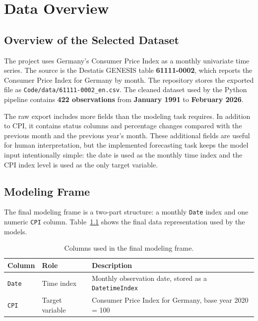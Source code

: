 %
%
%

\chapter{Data Overview}
\label{ch:data-overview}

\section{Overview of the Selected Dataset}

The project uses Germany's Consumer Price Index as a monthly univariate time series. The source is the Destatis GENESIS table \textbf{61111-0002}, which reports the Consumer Price Index for Germany by month. The repository stores the exported file as \texttt{Code/data/61111-0002\_en.csv}. The cleaned dataset used by the Python pipeline contains \textbf{422 observations} from \textbf{January 1991} to \textbf{February 2026}.

The raw export includes more fields than the modeling task requires. In addition to CPI, it contains status columns and percentage changes compared with the previous month and the previous year's month. These additional fields are useful for human interpretation, but the implemented forecasting task keeps the model input intentionally simple: the date is used as the monthly time index and the CPI index level is used as the only target variable.

\section{Modeling Frame}

The final modeling frame is a two-part structure: a monthly \texttt{Date} index and one numeric \texttt{CPI} column. Table~\ref{tab:data-overview-columns} shows the final data representation used by the models.

\begin{table}[htbp]
	\centering
	\caption{Columns used in the final modeling frame.}
	\label{tab:data-overview-columns}
	\begin{tabular}{lll}
		\hline
		Column & Role & Description \\
		\hline
		\texttt{Date} & Time index & Monthly observation date, stored as a \texttt{DatetimeIndex} \\
		\texttt{CPI} & Target variable & Consumer Price Index for Germany, base year 2020 = 100 \\
		\hline
	\end{tabular}
\end{table}

